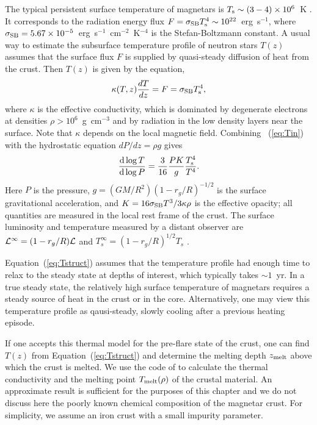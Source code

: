 The typical persistent surface temperature of magnetars is $T_{\rm s}\sim (3-4)\times 10^6$~K \citep{2006csxs.book..547W}. 
It corresponds to the radiation energy flux $F=\sigma_{\rm SB} T_{\rm s}^4\sim 10^{22}$~erg~s$^{-1}$, where $\sigma_{\rm SB}=5.67\times 10^{-5}$~erg~s$^{-1}$~cm$^{-2}$~K$^{-4}$ is the Stefan-Boltzmann constant. 
A usual way to estimate the subsurface temperature profile of neutron stars $T(z)$ assumes that the surface flux $F$ is supplied by quasi-steady diffusion of heat from the crust. Then $T(z)$ is given by the equation,
\begin{equation}
\label{eq:Tin}
   \kappa(T,z) \frac{dT}{dz} =F=\sigma_{\rm SB} T_{\rm s}^4,
\end{equation}
where $\kappa$ is the effective conductivity, which is dominated by degenerate electrons at densities $\rho>10^6$~g~cm$^{-3}$ and by radiation in the low density layers near the surface. 
Note that $\kappa$ depends on the local magnetic field. 
Combining \Eq~(\ref{eq:Tin}) with the hydrostatic equation $dP/dz=\rho g$ gives
\begin{equation}
\label{eq:Tstruct}
   \frac{\mathrm{d} \log T}{\mathrm{d} \log P}=\frac{3}{16}\frac{PK}{g}\frac{T_{\rm s}^4}{T^4}.
\end{equation}
Here $P$ is the pressure, $g=(GM/R^2)(1-r_g/R)^{-1/2}$ is the surface gravitational acceleration, and $K=16\sigma_{\rm SB} T^3 /3\kappa \rho$ is the effective opacity; all quantities are measured in the local rest frame of the crust. The surface luminosity and temperature measured by a distant observer are $\mathcal{L}^\infty = (1-r_g/R)\mathcal{L}$ and $T_s^{\infty} = (1-r_g/R)^{1/2} T_s$ \citep{1977ApJ...212..825T}.

Equation~(\ref{eq:Tstruct}) assumes that the temperature profile had enough time to relax to the steady state at depths of interest, which typically takes $\sim 1$~yr. 
In a true steady state, the relatively high surface temperature of magnetars requires a steady source of heat in the crust \citep{2006MNRAS.371..477K}
or in the core.
Alternatively, one may view this temperature profile as qausi-steady, slowly cooling after a previous heating episode.

If one accepts this thermal model for the pre-flare state of the crust, one can find $T(z)$ from Equation~(\ref{eq:Tstruct}) and determine the melting depth $z_{\rm melt}$ above which the crust is melted. 
We use the code of \citet{1999A&A...351..787P} to calculate the thermal conductivity and the melting point $T_{\rm melt}(\rho)$ of the crustal material. 
An approximate result is sufficient for the purposes of this chapter and we do not discuss here the poorly known chemical composition of the magnetar crust. 
For simplicity, we assume an iron crust with a small impurity parameter.

